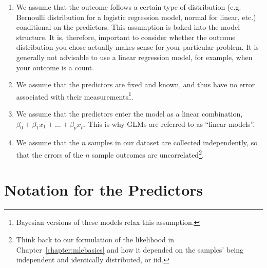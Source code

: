 \begin{enumerate}
\item We assume that the outcome follows a certain type of distribution (e.g. Bernoulli distribution for a logistic regression model, normal for linear, etc.) conditional on the predictors. This assumption is baked into the model structure. It is, therefore, important to consider whether the outcome distribution you chose actually makes sense for your particular problem. It is generally not advisable to use a linear regression model, for example, when your outcome is a count. 
\item We assume that the predictors are fixed and known, and thus have no error associated with their measurements\footnote{Bayesian versions of these models relax this assumption.}.
\item We assume that the predictors enter the model as a linear combination, $\beta_0 + \beta_1 x_1 + \dots + \beta_p x_p$. This is why GLMs are referred to as ``linear models''. 
\item We assume that the $n$ samples in our dataset are collected independently, so that the errors of the $n$ sample outcomes are uncorrelated\footnote{Think back to our formulation of the likelihood in Chapter~\ref{chapter:mlebasics} and how it depended on the samples' being independent and identically distributed, or iid.}.
\end{enumerate}


\section{Notation for the Predictors}

